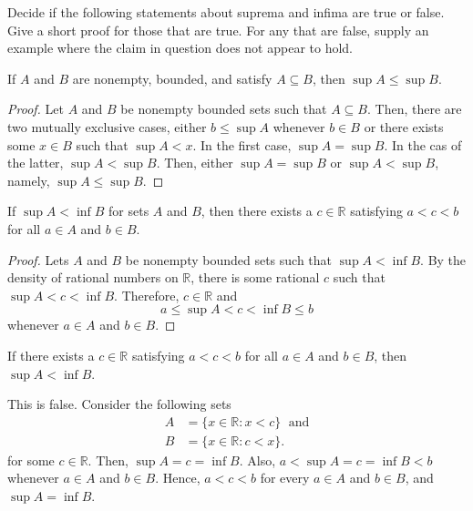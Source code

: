 \documentclass[12pt]{article}
\newcommand{\R}{\mathbb{R}}
\newenvironment{problem}[2][Problem]{\begin{trivlist}
		\item[\hskip \labelsep {\bfseries #1}\hskip \labelsep {\bfseries #2.}]}{\end{trivlist}}
\newenvironment{solution}[2][Solution]{\begin{trivlist}
		\item[\hskip \labelsep {\bfseries #1}\hskip \labelsep {\bfseries #2.}]}{\end{trivlist}}
\begin{document}
		\begin{problem}{1.3.11}
			Decide if the following statements about suprema and infima are true or false. Give a short proof for those that are true. For any that are false, supply an example where the claim in question does not appear to hold.
			\begin{enumerate}[label=(\alph*)]
				\item If $A$ and $B$ are nonempty, bounded, and satisfy $A\subseteq B$, then $\sup A \leq \sup B$.
				\begin{proof}
					Let $A$ and $B$ be nonempty bounded sets such that $A\subseteq B$. Then, there are two mutually exclusive cases, either $b\leq \sup A$ whenever $b\in B$ or there exists some $x\in B$ such that $\sup A <x$. In the first case, $\sup A = \sup B$. In the cas of the latter, $\sup A < \sup B$. Then, either $\sup A = \sup B$ or $\sup A < \sup B$, namely, $\sup A \leq \sup B$.
				\end{proof}
				\item If $\sup A < \inf B$ for sets $A$ and $B$, then there exists a $c\in \R$ satisfying $a<c<b$ for all $a\in A$ and $b\in B$.
				\begin{proof}
					Lets $A$ and $B$ be nonempty bounded sets such that $\sup A<\inf B$. By the density of rational numbers on $\R$, there is some rational $c$ such that $\sup A < c < \inf B$. Therefore, $c\in \R$ and 
					\begin{equation*}
						a \leq \sup A < c < \inf B \leq b
					\end{equation*} 
				whenever $a\in A$ and $b\in B$.
				\end{proof}
				\item If there exists a $c\in \R$ satisfying $a<c<b$ for all $a\in A$ and $b\in B$, then $\sup A < \inf B$.
				\begin{solution}{(c)}
					This is false. Consider the following sets
					\begin{align*}
						A&=\{x\in \R: x<c\} \; \text{ and}\\
						B&=\{x\in \R: c<x\}.
					\end{align*} 
				for some $c\in \R$. Then, $\sup A = c = \inf B$. Also, $a<\sup A = c = \inf B<b$ whenever $a\in A$ and $b\in B$. Hence, $a<c<b$ for every $a\in A$ and $b\in B$, and $\sup A = \inf B$.
				
				\end{solution}
			 
			\end{enumerate}
		\end{problem}
\end{document}
